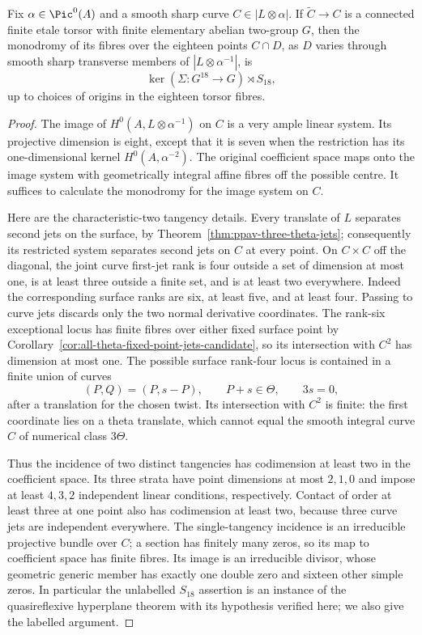 \begin{lemma}
\label{lem:nonordinary-ppav-two-lifted-intersections-candidate}
Fix $\alpha\in\Pic^0(A)$ and a smooth sharp curve
$C\in|L\otimes\alpha|$. If $\widetilde C\to C$ is a connected
finite etale torsor with finite elementary abelian two-group $G$,
then the monodromy of its fibres over the eighteen points $C\cap D$,
as $D$ varies through smooth sharp transverse members of
$|L\otimes\alpha^{-1}|$, is
\[
                 \ker(\Sigma:G^{18}\to G)\rtimes S_{18},
\]
up to choices of origins in the eighteen torsor fibres.
\end{lemma}
\begin{proof}
The image of $H^0(A,L\otimes\alpha^{-1})$ on $C$ is a very ample
linear system. Its projective dimension is eight, except that it
is seven when the restriction has its one-dimensional kernel
$H^0(A,\alpha^{-2})$. The original coefficient space maps onto
the image system with geometrically integral affine fibres off
the possible centre. It suffices to calculate the monodromy for
the image system on $C$.

Here are the characteristic-two tangency details. Every translate
of $L$ separates second jets on the surface, by
Theorem~\ref{thm:ppav-three-theta-jets}; consequently its restricted
system separates second jets on $C$ at every point. On $C\times C$
off the diagonal, the joint curve first-jet rank is four outside
a set of dimension at most one, is at least three outside a finite
set, and is at least two everywhere. Indeed the corresponding
surface ranks are six, at least five, and at least four. Passing
to curve jets discards only the two normal derivative coordinates.
The rank-six exceptional locus has finite fibres over either
fixed surface point by
Corollary~\ref{cor:all-theta-fixed-point-jets-candidate}, so its
intersection with $C^2$ has dimension at most one. The possible
surface rank-four locus is contained in a finite union of curves
\[
                 (P,Q)=(P,s-P),\qquad P+s\in\Theta,
                 \qquad 3s=0,
\]
after a translation for the chosen twist. Its intersection with
$C^2$ is finite: the first coordinate lies on a theta translate,
which cannot equal the smooth integral curve $C$ of numerical
class $3\Theta$.

Thus the incidence of two distinct tangencies has codimension at
least two in the coefficient space. Its three strata have point
dimensions at most $2,1,0$ and impose at least $4,3,2$ independent
linear conditions, respectively. Contact of order at least three
at one point also has codimension at least two, because three
curve jets are independent everywhere. The single-tangency
incidence is an irreducible projective bundle over $C$; a section
has finitely many zeros, so its map to coefficient space has finite
fibres. Its image is an irreducible divisor, whose geometric generic
member has exactly one double zero and sixteen other simple zeros.
In particular the unlabelled $S_{18}$ assertion is an instance of
the quasireflexive hyperplane theorem
\cite[Theorem~2 and Proposition~3.1]{Entin2021} with its hypothesis
verified here; we also give the labelled argument.


\end{proof}
